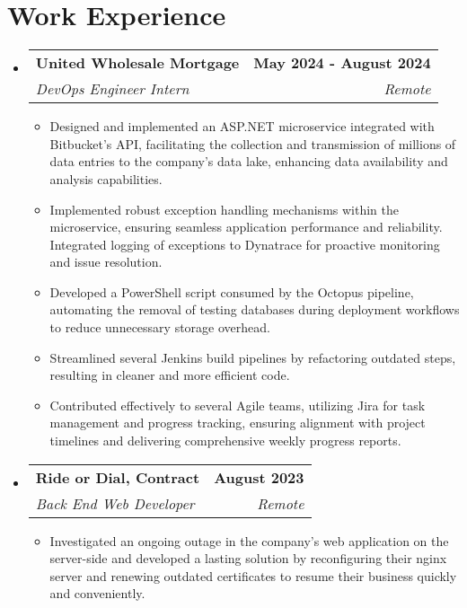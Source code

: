 \documentclass[letterpaper,11pt]{article}
\makeatletter
\newcommand{\resumeItem}[1]{
  \item\small{
    {#1 \vspace{-2pt}}
  }
}
\newcommand{\resumeSubheading}[4]{
  \vspace{-2pt}\item
    \begin{tabular*}{1.0\textwidth}[t]{l@{\extracolsep{\fill}}r}
      \textbf{#1} & \textbf{\small #2} \\
      \textit{\small#3} & \textit{\small #4} \\
    \end{tabular*}\vspace{-7pt}
}
\newcommand{\resumeSubHeadingListStart}{\begin{itemize}[leftmargin=0.0in, label={}]}
\newcommand{\resumeSubHeadingListEnd}{\end{itemize}}
\newcommand{\resumeItemListStart}{\begin{itemize}}
\newcommand{\resumeItemListEnd}{\end{itemize}\vspace{-5pt}}
\makeatother
\begin{document}
\section{Work Experience}
  \resumeSubHeadingListStart
    \resumeSubheading
      {United Wholesale Mortgage}{May 2024 - August 2024}
      {DevOps Engineer Intern}{Remote}
      \resumeItemListStart
        \resumeItem{Designed and implemented an ASP.NET microservice integrated with Bitbucket's API, facilitating the collection and transmission of millions of data entries to the company's data lake, enhancing data availability and analysis capabilities.}
        \resumeItem{Implemented robust exception handling mechanisms within the microservice, ensuring seamless application performance and reliability. Integrated logging of exceptions to Dynatrace for proactive monitoring and issue resolution.}
        \resumeItem{Developed a PowerShell script consumed by the Octopus pipeline, automating the removal of testing databases during deployment workflows to reduce unnecessary storage overhead.}
        \resumeItem{Streamlined several Jenkins build pipelines by refactoring outdated steps, resulting in cleaner and more efficient code.}
        \resumeItem{Contributed effectively to several Agile teams, utilizing Jira for task management and progress tracking, ensuring alignment with project timelines and delivering comprehensive weekly progress reports.}
    \resumeItemListEnd 
    \resumeSubheading
      {Ride or Dial, Contract}{August 2023}
      {Back End Web Developer}{Remote}
      \resumeItemListStart
        \resumeItem{Investigated an ongoing outage in the company's web application on the server-side and developed a lasting solution by reconfiguring their nginx server and renewing outdated certificates to resume their business quickly and conveniently.}
    \resumeItemListEnd    
  \resumeSubHeadingListEnd
\vspace{-16pt}

\end{document}
